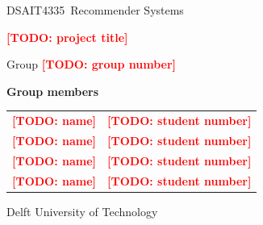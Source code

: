 \documentclass[11pt,a4paper]{article}
\newcommand{\coursecode}{DSAIT4335}
\newcommand{\coursename}{Recommender Systems}
\newcommand{\projecttitle}{\TODO{project title}}
\newcommand{\groupnumber}{\TODO{group number}}
\newcommand{\TODO}[1]{\textcolor{red}{\textbf{[TODO: #1]}}}
\begin{document}
\begin{titlepage}
  \centering
  \vspace*{3cm}
  {\large \coursecode\ \coursename\par}
  \vspace{1.5cm}
  {\Huge\bfseries \projecttitle\par}
  \vspace{1.5cm}
  {\Large Group \groupnumber\par}
  \vspace{1.5cm}
  {\large\bfseries Group members\par}
  \vspace{0.5em}
  \begin{tabular}{ll}
    \TODO{name} & \TODO{student number}\\
    \TODO{name} & \TODO{student number}\\
    \TODO{name} & \TODO{student number}\\
    \TODO{name} & \TODO{student number}\\
  \end{tabular}
  \vfill
  {\large Delft University of Technology}
\end{titlepage}





\appendix

\end{document}

